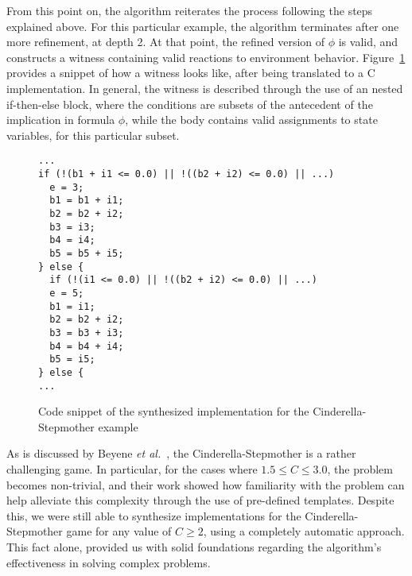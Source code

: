 From this point on, the algorithm reiterates the process following the steps
explained above. For this particular example, the algorithm terminates after one
more refinement, at depth 2. At that point, the refined version of
$\phi$ is valid, and \aeval constructs a witness containing valid reactions to
environment behavior. Figure~\ref{fg:witness} provides a snippet of how a
witness looks like, after being translated to a C implementation. In general,
the witness is described through the use of an nested if-then-else block, where the conditions are subsets of the antecedent of
the implication in formula $\phi$, while the body contains valid assignments to
state variables, for this particular subset.


\begin{figure}[!t]
\centering
 \begin{Verbatim}[fontsize=\footnotesize]
...
if (!(b1 + i1 <= 0.0) || !((b2 + i2) <= 0.0) || ...)
  e = 3;
  b1 = b1 + i1;
  b2 = b2 + i2;
  b3 = i3;
  b4 = i4;
  b5 = b5 + i5;
} else {
  if (!(i1 <= 0.0) || !((b2 + i2) <= 0.0) || ...)
  e = 5;
  b1 = i1;
  b2 = b2 + i2;
  b3 = b3 + i3;
  b4 = b4 + i4;
  b5 = i5;
} else {
...
 \end{Verbatim}
\caption{Code snippet of the synthesized implementation for the Cinderella-Stepmother
example}
\label{fg:witness}
\end{figure}

As is discussed by Beyene \textit{et al.}~\cite{beyene2014constraint}, the
Cinderella-Stepmother is a rather challenging game. In particular, for the
cases where $1.5 \leq C \leq 3.0$, the problem becomes non-trivial, and their
work showed how familiarity with the problem can help alleviate this complexity
through the use of pre-defined templates. Despite this, we were still
able to synthesize implementations for the Cinderella-Stepmother game for any
value of $C \geq 2$, using a completely automatic approach. This fact alone,
provided us with solid foundations regarding the algorithm's effectiveness in
solving complex problems.
